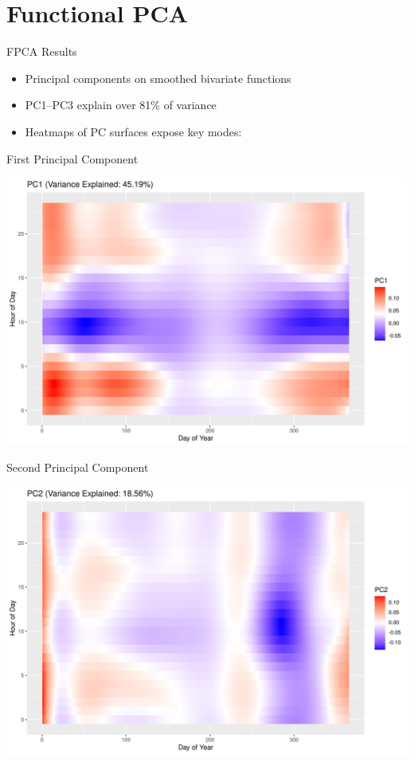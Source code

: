 \documentclass[svgnames, 12pt]{beamer}
\begin{document}
\section{Functional PCA}

\begin{frame}{FPCA Results}
	\begin{itemize}
		\item Principal components on smoothed bivariate functions
		\item PC1--PC3 explain over 81\% of variance
		\item Heatmaps of PC surfaces expose key modes:
	\end{itemize}
\end{frame}

\begin{frame}{First Principal Component}
	\begin{center}
		\includegraphics[width=0.8\linewidth]{../notebooks/assets/pc1_heatmap.png}
	\end{center}
\end{frame}

\begin{frame}{Second Principal Component}
	\begin{center}
		\includegraphics[width=0.8\linewidth]{../notebooks/assets/pc2_heatmap.png}
	\end{center}
\end{frame}
\end{document}
